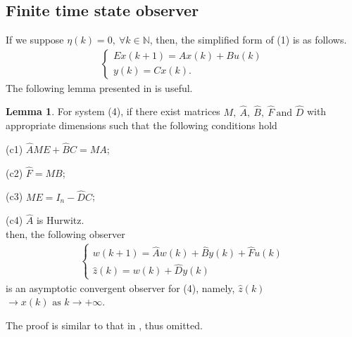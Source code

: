 \documentclass[english]{cccconf}
\theoremstyle{definition}
\newtheorem{lemma}{Lemma}
\begin{document}
\subsection{Finite time state observer}
If we suppose $\eta(k)=0,\ \forall k\in\mathbb{N}$, then, the simplified form of (1) is as follows.
\begin{equation}\begin{split}\begin{cases}
Ex(k+1)=Ax(k)+Bu(k)\\
y(k)=Cx(k).
\end{cases}\end{split}\end{equation}
The following lemma presented in \cite{5573041} is useful.
\begin{lemma} For system (4), if there exist matrices $M,\ \hat{A},\ \hat{B},\ \hat{F}\ \text{and }\hat{D}$ with appropriate dimensions such that the following conditions hold

(c1) $\hat{A}ME+\hat{B}C=MA$;

(c2) $\hat{F}=MB$;

(c3) $ME=I_n-\hat{D}C$;

(c4) $\hat{A}$ is Hurwitz.\\
then, the following observer
\begin{equation}\begin{split}\begin{cases}
w(k+1)=\hat{A}w(k)+\hat{B}y(k)+\hat{F}u(k)\\
\hat{z}(k)=w(k)+\hat{D}y(k)
\end{cases}\end{split}\end{equation}
is an asymptotic convergent observer for (4), namely, $\hat{z}(k)$$\rightarrow x(k) \text{ as } k\rightarrow +\infty$.
\end{lemma}
The proof is similar to that in \citep{5573041}, thus omitted.
\end{document}
